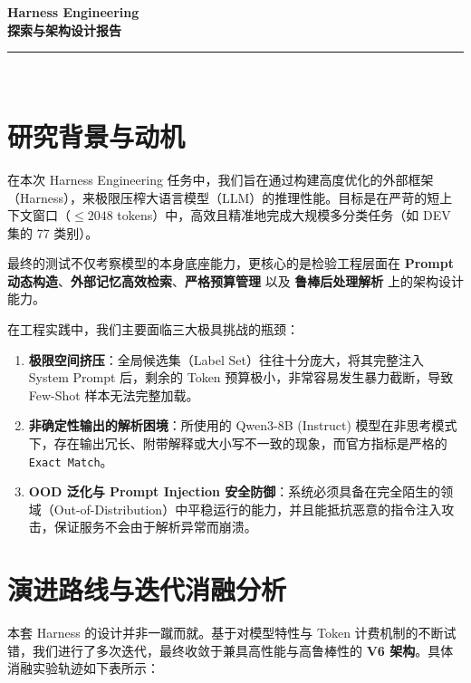 \documentclass[11pt, a4paper]{ctexart}
\begin{document}
\begin{center}
    \vspace*{2em}
    {\Huge \bfseries \textcolor{primary}{Harness Engineering}} \\[0.5em]
    {\LARGE \bfseries 探索与架构设计报告} \\[1.5em]
    \textcolor{gray}{\rule{0.8\textwidth}{0.8pt}} \\[2em]
\end{center}

\section{研究背景与动机}

在本次 Harness Engineering 任务中，我们旨在通过构建高度优化的外部框架（Harness），来极限压榨大语言模型（LLM）的推理性能。目标是在严苛的短上下文窗口（$\le 2048$ tokens）中，高效且精准地完成大规模多分类任务（如 DEV 集的 77 类别）。

最终的测试不仅考察模型的本身底座能力，更核心的是检验工程层面在 \textbf{Prompt 动态构造}、\textbf{外部记忆高效检索}、\textbf{严格预算管理} 以及 \textbf{鲁棒后处理解析} 上的架构设计能力。

\begin{challengebox}
在工程实践中，我们主要面临三大极具挑战的瓶颈：
\begin{enumerate}[label=\textbf{\arabic*.}]
    \item \textbf{极限空间挤压}：全局候选集（Label Set）往往十分庞大，将其完整注入 System Prompt 后，剩余的 Token 预算极小，非常容易发生暴力截断，导致 Few-Shot 样本无法完整加载。
    \item \textbf{非确定性输出的解析困境}：所使用的 Qwen3-8B (Instruct) 模型在非思考模式下，存在输出冗长、附带解释或大小写不一致的现象，而官方指标是严格的 \texttt{Exact Match}。
    \item \textbf{OOD 泛化与 Prompt Injection 安全防御}：系统必须具备在完全陌生的领域（Out-of-Distribution）中平稳运行的能力，并且能抵抗恶意的指令注入攻击，保证服务不会由于解析异常而崩溃。
\end{enumerate}
\end{challengebox}

\section{演进路线与迭代消融分析}

本套 Harness 的设计并非一蹴而就。基于对模型特性与 Token 计费机制的不断试错，我们进行了多次迭代，最终收敛于兼具高性能与高鲁棒性的 \textbf{V6 架构}。具体消融实验轨迹如下表所示：
\end{document}
